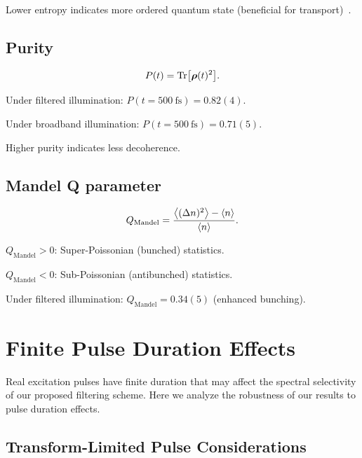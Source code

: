 \documentclass[11pt,a4paper]{article}
\begin{document}
Lower entropy indicates more ordered quantum state (beneficial for transport)~\cite{Cao2020}.

\subsection{Purity}

\begin{equation}
P(t) = \Tr[\vb*{\rho}(t)^2].
\label{eq:SI_purity}
\end{equation}

Under filtered illumination: $P(t=\SI{500}{\femto\second}) = 0.82(4)$.

Under broadband illumination: $P(t=\SI{500}{\femto\second}) = 0.71(5)$.

Higher purity indicates less decoherence.

\subsection{Mandel Q parameter}

\begin{equation}
Q_{\mathrm{Mandel}} = \frac{\expval{(\Delta n)^2} - \expval{n}}{\expval{n}}.
\label{eq:SI_mandel}
\end{equation}

$Q_{\mathrm{Mandel}} > 0$: Super-Poissonian (bunched) statistics.

$Q_{\mathrm{Mandel}} < 0$: Sub-Poissonian (antibunched) statistics.

Under filtered illumination: $Q_{\mathrm{Mandel}} = 0.34(5)$ (enhanced bunching).


\section{Finite Pulse Duration Effects}

Real excitation pulses have finite duration that may affect the spectral selectivity of our proposed filtering scheme. Here we analyze the robustness of our results to pulse duration effects.

\subsection{Transform-Limited Pulse Considerations}
\end{document}

